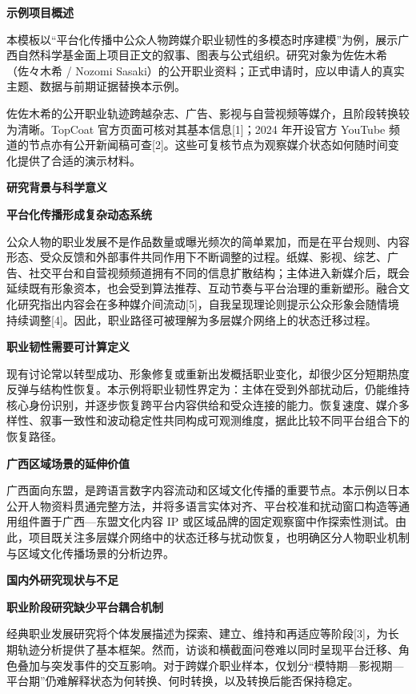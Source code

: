 \GXNSFBodyText

\noindent\textbf{示例项目概述}\par
本模板以“平台化传播中公众人物跨媒介职业韧性的多模态时序建模”为例，展示广西自然科学基金面上项目正文的叙事、图表与公式组织。研究对象为佐佐木希（佐々木希 / Nozomi Sasaki）的公开职业资料；正式申请时，应以申请人的真实主题、数据与前期证据替换本示例。

佐佐木希的公开职业轨迹跨越杂志、广告、影视与自营视频等媒介，且阶段转换较为清晰。TopCoat 官方页面可核对其基本信息[1]；2024 年开设官方 YouTube 频道的节点亦有公开新闻稿可查[2]。这些可复核节点为观察媒介状态如何随时间变化提供了合适的演示材料。

\noindent\textbf{研究背景与科学意义}\par

\noindent\textbf{平台化传播形成复杂动态系统}\par
公众人物的职业发展不是作品数量或曝光频次的简单累加，而是在平台规则、内容形态、受众反馈和外部事件共同作用下不断调整的过程。纸媒、影视、综艺、广告、社交平台和自营视频频道拥有不同的信息扩散结构；主体进入新媒介后，既会延续既有形象资本，也会受到算法推荐、互动节奏与平台治理的重新塑形。融合文化研究指出内容会在多种媒介间流动[5]，自我呈现理论则提示公众形象会随情境持续调整[4]。因此，职业路径可被理解为多层媒介网络上的状态迁移过程。

\noindent\textbf{职业韧性需要可计算定义}\par
现有讨论常以转型成功、形象修复或重新出发概括职业变化，却很少区分短期热度反弹与结构性恢复。本示例将职业韧性界定为：主体在受到外部扰动后，仍能维持核心身份识别，并逐步恢复跨平台内容供给和受众连接的能力。恢复速度、媒介多样性、叙事一致性和波动稳定性共同构成可观测维度，据此比较不同平台组合下的恢复路径。

\noindent\textbf{广西区域场景的延伸价值}\par
广西面向东盟，是跨语言数字内容流动和区域文化传播的重要节点。本示例以日本公开人物资料贯通完整方法，并将多语言实体对齐、平台校准和扰动窗口构造等通用组件置于广西—东盟文化内容 IP 或区域品牌的固定观察窗中作探索性测试。由此，项目既关注多层媒介网络中的状态迁移与扰动恢复，也明确区分人物职业机制与区域文化传播场景的分析边界。

\noindent\textbf{国内外研究现状与不足}\par

\noindent\textbf{职业阶段研究缺少平台耦合机制}\par
经典职业发展研究将个体发展描述为探索、建立、维持和再适应等阶段[3]，为长期轨迹分析提供了基本框架。然而，访谈和横截面问卷难以同时呈现平台迁移、角色叠加与突发事件的交互影响。对于跨媒介职业样本，仅划分“模特期—影视期—平台期”仍难解释状态为何转换、何时转换，以及转换后能否保持稳定。

